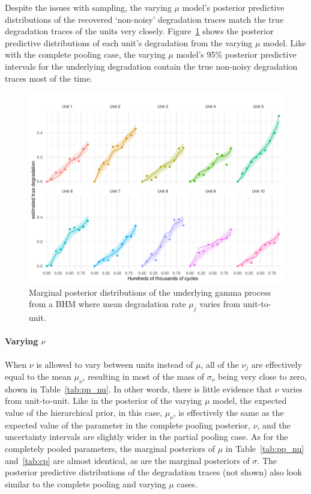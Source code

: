 Despite the issues with sampling, the varying $\mu$ model's posterior predictive distributions of the recovered `non-noisy' degradation traces match the true degradation traces of the units very closely. Figure~\ref{fig:pp_mu_filtered} shows the posterior predictive distributions of each unit's degradation from the varying $\mu$ model. Like with the complete pooling case, the varying $\mu$ model's 95\% posterior predictive intervals for the underlying degradation contain the true non-noisy degradation traces most of the time.

\begin{figure}[tbp]
   \centering
   \includegraphics[width=0.95\columnwidth]{./figures/ch-5/plot-pp-mu-filtered.pdf}
   \caption{Marginal posterior distributions of the underlying gamma process from a BHM where mean degradation rate $\mu_j$ varies from unit-to-unit.}
   \label{fig:pp_mu_filtered}
\end{figure}

\paragraph{Varying $\nu$} When $\nu$ is allowed to vary between units instead of $\mu$, all of the $\nu_j$ are effectively equal to the mean $\mu_\nu$, resulting in most of the mass of $\sigma_\nu$ being very close to zero, shown in Table~\ref{tab:pp_nu}. In other words, there is little evidence that $\nu$ varies from unit-to-unit. Like in the posterior of the varying $\mu$ model, the expected value of the hierarchical prior, in this case, $\mu_\nu$, is effectively the same as the expected value of the parameter in the complete pooling posterior, $\nu$, and the uncertainty intervals are slightly wider in the partial pooling case. As for the completely pooled parameters, the marginal posteriors of $\mu$ in Table~\ref{tab:pp_nu} and~\ref{tab:cp} are almost identical, as are the marginal posteriors of $\sigma$. The posterior predictive distributions of the degradation traces (not shown) also look similar to the complete pooling and varying $\mu$ cases.


